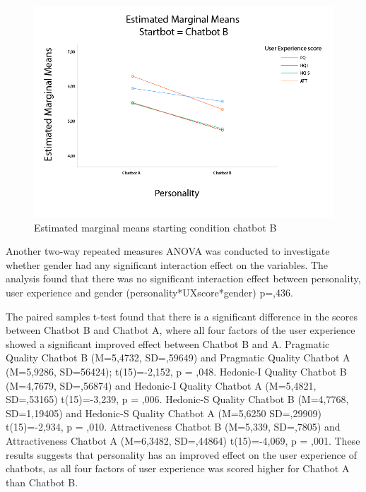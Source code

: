 \begin{figure}
    \centering
    \includegraphics[scale=0.4]{figures/MMeanStartbotB.png}
    \caption{Estimated marginal means starting condition chatbot B}
    \label{fig:startB}
\end{figure}

Another two-way repeated measures ANOVA was conducted to investigate whether gender had any significant interaction effect on the variables. The analysis found that there was no significant interaction effect between personality, user experience and gender (personality*UXscore*gender) p=,436.

The paired samples t-test found that there is a significant difference in the scores between Chatbot B and Chatbot A, where all four factors of the user experience showed a significant improved effect between Chatbot B and A. Pragmatic Quality Chatbot B (M=5,4732, SD=,59649) and Pragmatic Quality Chatbot A (M=5,9286, SD=56424); t(15)=-2,152, p = ,048. Hedonic-I Quality Chatbot B (M=4,7679, SD=,56874) and Hedonic-I Quality Chatbot A (M=5,4821, SD=,53165) t(15)=-3,239, p = ,006. Hedonic-S Quality Chatbot B (M=4,7768, SD=1,19405) and Hedonic-S Quality Chatbot A (M=5,6250 SD=,29909) t(15)=-2,934, p = ,010. Attractiveness Chatbot B (M=5,339, SD=,7805) and Attractiveness Chatbot A (M=6,3482, SD=,44864) t(15)=-4,069, p = ,001. These results suggests that personality has an improved effect on the user experience of chatbots, as all four factors of user experience was scored higher for Chatbot A than Chatbot B.

